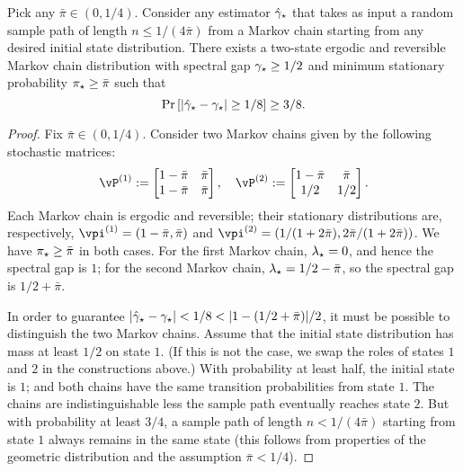 \begin{theorem}
  Pick any $\bar\pi \in (0,1/4)$.
  Consider any estimator $\hat\gamma_{\star}$ that takes as input a random sample
  path of length $n \leq 1/(4\bar\pi)$ from a Markov chain starting
  from any desired initial state distribution.
  There exists a two-state ergodic and reversible Markov chain
  distribution with spectral gap $\gamma_{\star} \geq 1/2$ and minimum
  stationary probability $\pi_{\star} \geq \bar\pi$ such that
  \[
    \Pr\left[ |\hat\gamma_{\star} - \gamma_{\star}| \geq 1/8 \right] \geq 3/8 .
  \]
\end{theorem}
\begin{proof}
  Fix $\bar\pi \in (0,1/4)$.
  Consider two Markov chains given by the following stochastic
  matrices:
  \[
    \vP^{(1)} :=
    \begin{bmatrix}
      1-\bar\pi & \bar\pi \\
      1-\bar\pi & \bar\pi
    \end{bmatrix}
    , \quad
    \vP^{(2)} :=
    \begin{bmatrix}
      1-\bar\pi & \bar\pi \\
      1/2 & 1/2
    \end{bmatrix}
    .
  \]
  Each Markov chain is ergodic and reversible; their stationary
  distributions are, respectively, $\vpi^{(1)} = (1-\bar\pi,\bar\pi)$
  and $\vpi^{(2)} = (1/(1+2\bar\pi),2\bar\pi/(1+2\bar\pi))$.
  We have $\pi_{\star} \geq \bar\pi$ in both cases.
  For the first Markov chain, $\lambda_{\star} = 0$, and hence the spectral gap
  is $1$; for the second Markov chain, $\lambda_{\star} = 1/2-\bar\pi$, so the
  spectral gap is $1/2+\bar\pi$.

  In order to guarantee $|\hat\gamma_{\star} - \gamma_{\star}| < 1/8 < |1 -
  (1/2+\bar\pi)|/2$, it must be possible to distinguish the two Markov
  chains.
  Assume that the initial state distribution has mass at least $1/2$
  on state $1$.
  (If this is not the case, we swap the roles of states $1$ and $2$ in
  the constructions above.)
  With probability at least half, the initial state is $1$; and both
  chains have the same transition probabilities from state $1$.
  The chains are indistinguishable less the sample path eventually
  reaches state $2$.
  But with probability at least $3/4$, a sample path of length $n <
  1/(4\bar\pi)$ starting from state $1$ always remains in the same
  state (this follows from properties of the geometric distribution
  and the assumption $\bar\pi < 1/4$).
\end{proof}


